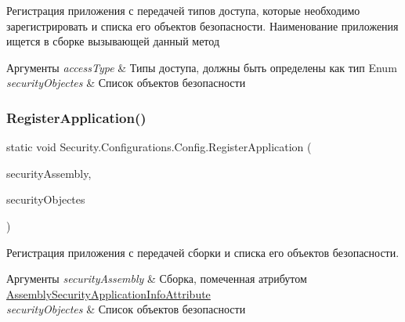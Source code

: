 Регистрация приложения с передачей типов доступа, которые необходимо зарегистрировать и списка его объектов безопасности. Наименование приложения ищется в сборке вызывающей данный метод 


\begin{DoxyParams}{Аргументы}
{\em access\+Type} & Типы доступа, должны быть определены как тип Enum\\
\hline
{\em security\+Objectes} & Список объектов безопасности\\
\hline
\end{DoxyParams}
\mbox{\label{class_security_1_1_configurations_1_1_config_a78ec86a8de51d6bf724e3a2a63a2ad8f}} 
\subsubsection{\texorpdfstring{Register\+Application()}{RegisterApplication()}\hspace{0.1cm}{\footnotesize\ttfamily [3/4]}}
{\footnotesize\ttfamily static void Security.\+Configurations.\+Config.\+Register\+Application (\begin{DoxyParamCaption}\item[{Assembly}]{security\+Assembly,  }\item[{params \hyperlink{interface_security_1_1_interfaces_1_1_i_security_objects}{I\+Security\+Objects} \mbox{[}$\,$\mbox{]}}]{security\+Objectes }\end{DoxyParamCaption})\hspace{0.3cm}{\ttfamily [static]}}



Регистрация приложения с передачей сборки и списка его объектов безопасности. 


\begin{DoxyParams}{Аргументы}
{\em security\+Assembly} & Сборка, помеченная атрибутом \hyperlink{class_security_1_1_assembly_security_application_info_attribute}{Assembly\+Security\+Application\+Info\+Attribute}\\
\hline
{\em security\+Objectes} & Список объектов безопасности\\
\hline
\end{DoxyParams}
\mbox{\label{class_security_1_1_configurations_1_1_config_a3678c65f12c9c31d2a1aa035e5432d60}} 
